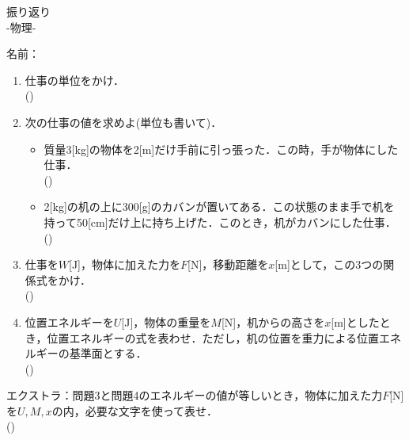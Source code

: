 \documentclass[fontsize=15pt]{jlreq}
\newcommand{\m}[1]{\raisebox{0.1em}{\textcircled{\scriptsize #1}}}
\begin{document}
\begin{center}
{\LARGE {振り返り}} \\
-物理\m{6}- %
\end{center}
\vspace{1em}
\begin{flushright}
名前：\underline{\hspace{5cm}}
\end{flushright}

\begin{enumerate}
    \item 仕事の単位をかけ．\\
    (\hspace{3cm})
    \vspace{2em} 

    \item 次の仕事の値を求めよ(単位も書いて)．\\
    \begin{itemize}
        \item[(1)] 質量3[kg]の物体を2[m]だけ手前に引っ張った．この時，手が物体にした仕事．\\
        (\hspace{4cm})
        \item[(2)] 2[kg]の机の上に300[g]のカバンが置いてある．この状態のまま手で机を持って50[cm]だけ上に持ち上げた．このとき，机がカバンにした仕事．\\
        (\hspace{4cm})
    \end{itemize}
    \vspace{2em}

    \item 仕事を$W$[J]，物体に加えた力を$F$[N]，移動距離を$x$[m]として，この3つの関係式をかけ．\\
    (\hspace{15cm})
    \vspace{2em}

    \item 位置エネルギーを$U$[J]，物体の重量を$M$[N]，机からの高さを$x$[m]としたとき，位置エネルギーの式を表わせ．ただし，机の位置を重力による位置エネルギーの基準面とする．\\
    (\hspace{15cm})
\end{enumerate}
エクストラ：問題3と問題4のエネルギーの値が等しいとき，物体に加えた力$F$[N]を$U,M,x$の内，必要な文字を使って表せ．\\
(\hspace{15cm})
\end{document}
